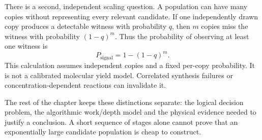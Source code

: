 There is a second, independent scaling question. A population can have many
copies without representing every relevant candidate. If one independently
drawn copy produces a detectable witness with probability $q$, then $m$ copies
miss the witness with probability $(1-q)^m$. Thus the probability of observing
at least one witness is
\begin{equation}
P_{\mathrm{signal}}=1-(1-q)^m.
\end{equation}
This calculation assumes independent copies and a fixed per-copy probability.
It is not a calibrated molecular yield model. Correlated synthesis failures
or concentration-dependent reactions can invalidate it.

The rest of the chapter keeps these distinctions separate: the logical
decision problem, the algorithmic work/depth model and the physical evidence
needed to justify a conclusion. A short sequence of stages alone cannot prove
that an exponentially large candidate population is cheap to construct.
